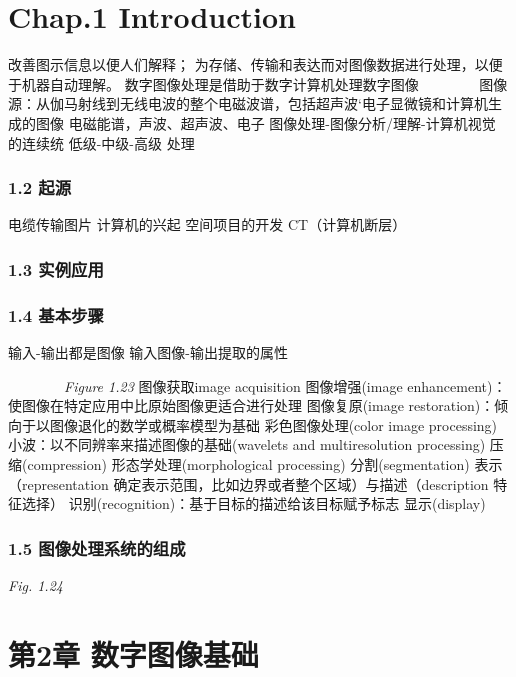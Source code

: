 \documentclass[]{article}
\date{}
\begin{document}
\section{Chap.1 Introduction}\label{header-n0}

 改善图示信息以便人们解释；
为存储、传输和表达而对图像数据进行处理，以便于机器自动理解。
数字图像处理是借助于数字计算机处理数字图像
\(\qquad\)\(\qquad\)图像源：从伽马射线到无线电波的整个电磁波谱，包括超声波`电子显微镜和计算机生成的图像
电磁能谱，声波、超声波、电子 图像处理-图像分析/理解-计算机视觉 的连续统
低级-中级-高级 处理

\subsubsection{1.2 起源}\label{header-n10}

 电缆传输图片 计算机的兴起 空间项目的开发 CT（计算机断层）

\subsubsection{1.3 实例应用}\label{header-n16}

\subsubsection{1.4 基本步骤}\label{header-n17}

 输入-输出都是图像 输入图像-输出提取的属性

\(\qquad\)\(\qquad\)\emph{Figure 1.23} 图像获取image acquisition
图像增强(image enhancement)：使图像在特定应用中比原始图像更适合进行处理
图像复原(image restoration)：倾向于以图像退化的数学或概率模型为基础
彩色图像处理(color image processing)
小波：以不同辨率来描述图像的基础(wavelets and multiresolution
processing) 压缩(compression) 形态学处理(morphological processing)
分割(segmentation) 表示（representation
确定表示范围，比如边界或者整个区域）与描述（description 特征选择）
识别(recognition)：基于目标的描述给该目标赋予标志 显示(display)

\subsubsection{1.5 图像处理系统的组成}\label{header-n34}

 \emph{Fig. 1.24}

\section{第2章 数字图像基础}\label{header-n37}
\end{document}
